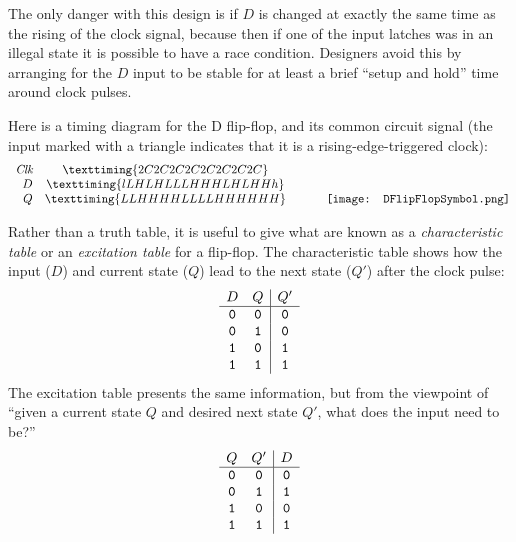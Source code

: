 The only danger with this design is if $D$ is changed at exactly the same time as the rising of the clock signal, because then if one of the input latches was in an illegal state it is possible to have a race condition. Designers avoid this by arranging for the $D$ input to be stable for at least a brief ``setup and hold'' time around clock pulses.

Here is a timing diagram for the D flip-flop, and its common circuit signal (the input marked with a triangle indicates that it is a rising-edge-triggered clock):
\[ \begin{array}[b]{rc}
\textit{Clk} & \texttiming{2C2C2C2C2C2C2C2C}\\
D & \texttiming{lLHLHLLLHHHLHLHHh}\\
Q & \texttiming{LLHHHHLLLLHHHHHH}
\end{array}\hspace{1cm}
\texttt{[image: DFlipFlopSymbol.png]}
\]

Rather than a truth table, it is useful to give what are known as a \emph{characteristic table} or an \emph{excitation table} for a flip-flop. The characteristic table shows how the input ($D$) and current state ($Q$) lead to the next state ($Q'$) after the clock pulse:
\[ \begin{array}{cc|c}
D & Q & Q'\\ \hline
\mathtt{0} & \mathtt{0} & \mathtt{0}\\
\mathtt{0} & \mathtt{1} & \mathtt{0}\\
\mathtt{1} & \mathtt{0} & \mathtt{1}\\
\mathtt{1} & \mathtt{1} & \mathtt{1}
\end{array} \]
The excitation table presents the same information, but from the viewpoint of ``given a current state $Q$ and desired next state $Q'$, what does the input need to be?''
\[ \begin{array}{cc|c}
Q & Q' & D\\ \hline
\mathtt{0} & \mathtt{0} & \mathtt{0}\\
\mathtt{0} & \mathtt{1} & \mathtt{1}\\
\mathtt{1} & \mathtt{0} & \mathtt{0}\\
\mathtt{1} & \mathtt{1} & \mathtt{1}
\end{array} \]


